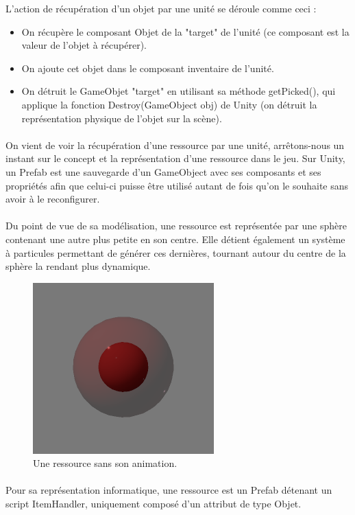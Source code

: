 \documentclass{report}
\begin{document}
L'action de récupération d'un objet par une unité se déroule comme ceci :
\begin{itemize}
\item On récupère le composant Objet de la "target" de l'unité (ce composant est la valeur de l'objet à récupérer).
\item On ajoute cet objet dans le composant inventaire de l'unité.
\item On détruit le GameObjet "target" en utilisant sa méthode getPicked(), qui applique la fonction Destroy(GameObject obj) de Unity (on détruit la représentation physique de l'objet sur la scène).
\end{itemize}
\paragraph{}On vient de voir la récupération d'une ressource par une unité, arrêtons-nous un instant sur le concept et la représentation d'une ressource dans le jeu. Sur Unity, un Prefab est une sauvegarde d'un GameObject avec ses composants et ses propriétés afin que celui-ci puisse être utilisé autant de fois qu'on le souhaite sans avoir à le reconfigurer.

\paragraph{}Du point de vue de sa modélisation, une ressource est représentée par une sphère contenant une autre plus petite en son centre. Elle détient également un système à particules permettant de générer ces dernières, tournant autour du centre de la sphère la rendant plus dynamique. 
\begin{figure}[!h]
\centering
\includegraphics[scale=0.5]{Ressource}
\caption{Une ressource sans son animation.}
\end{figure}
\paragraph{} Pour sa représentation informatique, une ressource est un Prefab détenant un script ItemHandler, uniquement composé d'un attribut de type Objet.
\end{document}
